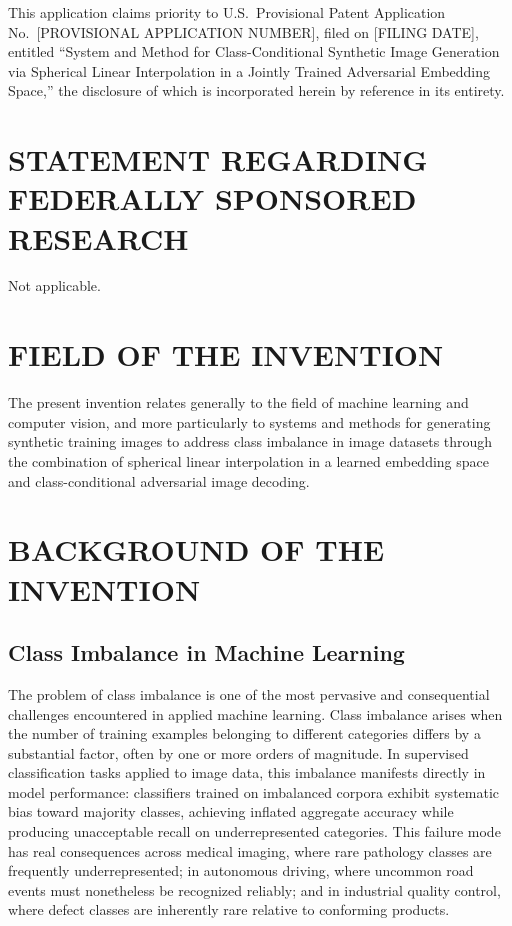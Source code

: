 \documentclass[12pt,letterpaper]{article}
\begin{document}
This application claims priority to U.S.\ Provisional Patent Application
No.\ [PROVISIONAL APPLICATION NUMBER], filed on [FILING DATE], entitled
``System and Method for Class-Conditional Synthetic Image Generation via
Spherical Linear Interpolation in a Jointly Trained Adversarial Embedding
Space,'' the disclosure of which is incorporated herein by reference in its
entirety.

\section*{STATEMENT REGARDING FEDERALLY SPONSORED RESEARCH}

Not applicable.

\section*{FIELD OF THE INVENTION}

The present invention relates generally to the field of machine learning and
computer vision, and more particularly to systems and methods for generating
synthetic training images to address class imbalance in image datasets through
the combination of spherical linear interpolation in a learned embedding space
and class-conditional adversarial image decoding.

\section*{BACKGROUND OF THE INVENTION}

\subsection{Class Imbalance in Machine Learning}

The problem of class imbalance is one of the most pervasive and consequential
challenges encountered in applied machine learning. Class imbalance arises when
the number of training examples belonging to different categories differs by a
substantial factor, often by one or more orders of magnitude. In supervised
classification tasks applied to image data, this imbalance manifests directly
in model performance: classifiers trained on imbalanced corpora exhibit
systematic bias toward majority classes, achieving inflated aggregate accuracy
while producing unacceptable recall on underrepresented categories. This
failure mode has real consequences across medical imaging, where rare pathology
classes are frequently underrepresented; in autonomous driving, where uncommon
road events must nonetheless be recognized reliably; and in industrial quality
control, where defect classes are inherently rare relative to conforming
products.
\end{document}

